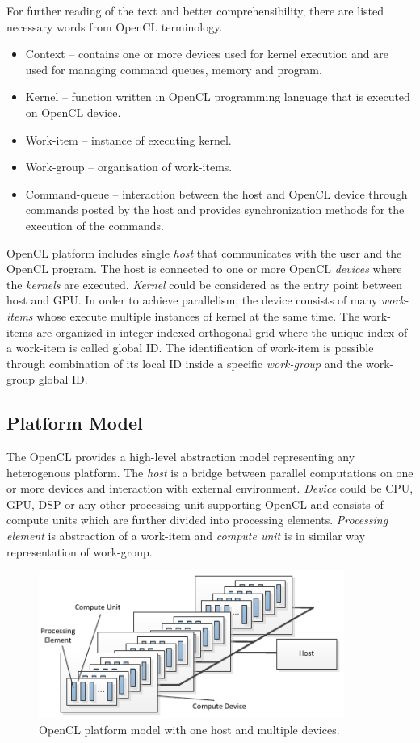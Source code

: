 For further reading of the text and better comprehensibility, there are
listed necessary words from OpenCL terminology\cite{opencl}.
\begin{itemize}
\item Context -- contains one or more devices used for kernel execution
and are used for managing command queues, memory and program.
\item Kernel -- function written in OpenCL programming language that 
is executed on OpenCL device. 
\item Work-item -- instance of executing kernel. 
\item Work-group -- organisation of work-items. 
\item Command-queue -- interaction between the host and OpenCL
device through commands posted by the host and provides synchronization
methods for the execution of the commands.
\end{itemize}

OpenCL platform includes single \textit{host} that communicates with the user
and the OpenCL program. The host is connected to one or more
OpenCL \textit{devices} where the \textit{kernels} are executed. 
\textit{Kernel} could be considered as the entry point between host and
GPU. In order to achieve parallelism, the device consists of many 
\textit{work-items} whose execute multiple instances of kernel at the same 
time. The work-items are organized in integer indexed orthogonal grid where 
the unique index of a work-item is called global ID. The identification
of work-item is possible through combination of its local ID inside a specific
\textit{work-group} and the work-group global ID.

\subsection{Platform Model}
The OpenCL provides a high-level abstraction model representing any heterogenous
platform. The \textit{host} is a bridge between parallel computations on one or
more devices and interaction with external environment. \textit{Device} could be
CPU, GPU, DSP or any other processing unit supporting OpenCL and consists
of compute units which are further divided into processing elements. 
\textit{Processing element} is abstraction of a work-item and 
\textit{compute unit} is in similar way representation of work-group.

\begin{figure}[H]
\centering
\includegraphics[width=10cm]{fig/platform_model.pdf}
\caption[OpenCL platform model]{OpenCL platform model with one host and multiple
devices\cite{opencl}.}
\label{oclpm}
\end{figure}


